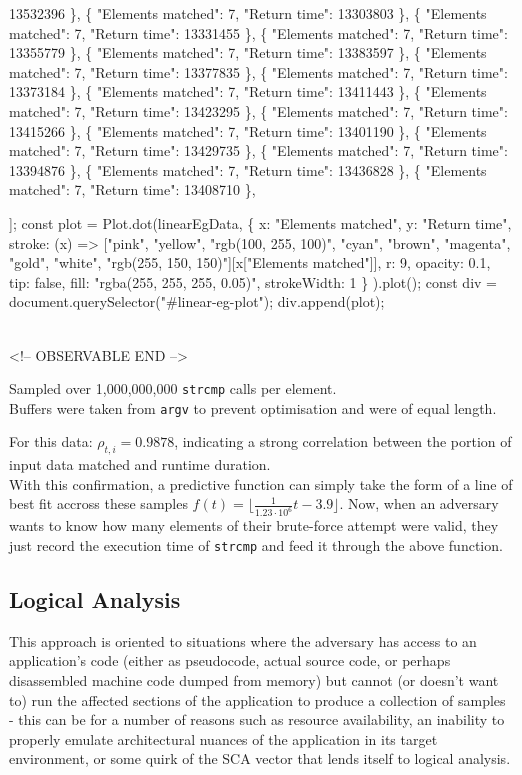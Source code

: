 13532396 \}, \{ "Elements matched": 7, "Return time": 13303803 \}, \{ "Elements matched": 7, "Return time": 13331455 \}, \{ "Elements matched": 7, "Return time": 13355779 \}, \{ "Elements matched": 7, "Return time": 13383597 \}, \{ "Elements matched": 7, "Return time": 13377835 \}, \{ "Elements matched": 7, "Return time": 13373184 \}, \{ "Elements matched": 7, "Return time": 13411443 \}, \{ "Elements matched": 7, "Return time": 13423295 \}, \{ "Elements matched": 7, "Return time": 13415266 \}, \{ "Elements matched": 7, "Return time": 13401190 \}, \{ "Elements matched": 7, "Return time": 13429735 \}, \{ "Elements matched": 7, "Return time": 13394876 \}, \{ "Elements matched": 7, "Return time": 13436828 \}, \{ "Elements matched": 7, "Return time": 13408710 \},


];
const plot = Plot.dot(linearEgData,
	\{
		x: "Elements matched", y: "Return time",
		stroke: (x) => ["pink", "yellow", "rgb(100, 255, 100)", "cyan", "brown", "magenta", "gold", "white", "rgb(255, 150, 150)"][x["Elements matched"]],
		r: 9, opacity: 0.1, tip: false, fill: "rgba(255, 255, 255, 0.05)", strokeWidth: 1
 	\}
).plot();
const div = document.querySelector("\#linear-eg-plot");
div.append(plot);

\\

<!-- OBSERVABLE END -->
		
			Sampled over 1,000,000,000 \texttt{strcmp} calls per element.
			\\

			Buffers were taken from \texttt{argv} to prevent optimisation and were of equal length.
		
		
			For this data: \emph{$\rho_{t,i} = 0.9878$}, indicating a strong correlation between the portion of input data matched and runtime duration.\\

			With this confirmation, a predictive function can simply take the form of a line of best fit accross these samples \emph{$f(t)=\lfloor\frac{1}{1.23\cdot10^6}t-3.9\rfloor$}.
			Now, when an adversary wants to know how many elements of their brute-force attempt were valid, they just record the execution time of \texttt{strcmp}
			and feed it through the above function.
		

\subsection{Logical Analysis}
		
			This approach is oriented to situations where the adversary has access to an application's code (either as pseudocode,
			actual source code, or perhaps disassembled machine code dumped from memory) but cannot (or doesn't want to) run the
			affected sections of the application to produce a collection of samples - this can be for a number of reasons such as
			resource availability, an inability to properly emulate architectural nuances of the application in its target environment,
			or some quirk of the SCA vector that lends itself to logical analysis.
		
